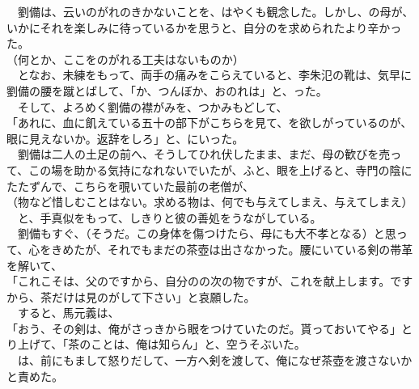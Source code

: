 \documentclass[
  paper=a5,
  fontsize=10pt,
  jafontsize=9.5pt,
  tate,                  %
  open_bracket_pos=nibu, %
]{jlreq}
\begin{document}
　劉備は、云いのがれのきかないことを、はやくも観念した。しかし、の母が、いかにそれを楽しみに待っているかを思うと、自分のを求められたより辛かった。\\


（何とか、ここをのがれる工夫はないものか）\\


　となお、未練をもって、両手の痛みをこらえていると、李朱氾の靴は、気早に劉備の腰を蹴とばして、「か、つんぼか、おのれは」と、った。\\


　そして、よろめく劉備の襟がみを、つかみもどして、\\


「あれに、血に飢えている五十の部下がこちらを見て、を欲しがっているのが、眼に見えないか。返辞をしろ」と、にいった。\\


　劉備は二人の土足の前へ、そうしてひれ伏したまま、まだ、母の歓びを売って、この場を助かる気持になれないでいたが、ふと、眼を上げると、寺門の陰にたたずんで、こちらを覗いていた最前の老僧が、\\


（物など惜しむことはない。求める物は、何でも与えてしまえ、与えてしまえ）\\


　と、手真似をもって、しきりと彼の善処をうながしている。\\


　劉備もすぐ、（そうだ。この身体を傷つけたら、母にも大不孝となる）と思って、心をきめたが、それでもまだの茶壺は出さなかった。腰にいている剣の帯革を解いて、\\


「これこそは、父のですから、自分のの次の物ですが、これを献上します。ですから、茶だけは見のがして下さい」と哀願した。\\


　すると、馬元義は、\\


「おう、その剣は、俺がさっきから眼をつけていたのだ。貰っておいてやる」とり上げて、「茶のことは、俺は知らん」と、空うそぶいた。\\


　は、前にもまして怒りだして、一方へ剣を渡して、俺になぜ茶壺を渡さないかと責めた。\\
\end{document}
